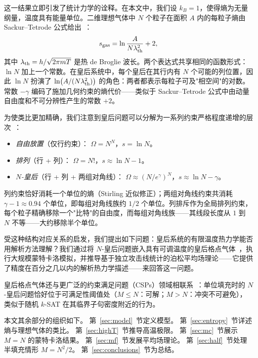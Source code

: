 \documentclass[aps, pre, reprint, amsmath, amssymb, superscriptaddress, floatfix]{revtex4-2}
\begin{document}
这一结果立即引发了统计力学的诠释。在本文中，我们设 $k_B = 1$，使得熵为无量纲量，温度具有能量单位。二维理想气体中 $N$ 个粒子在面积 $A$ 内的每粒子熵由 Sackur--Tetrode 公式给出~\cite{Reif1965}：
\begin{equation}
  s_{\rm gas} = \ln \frac{A}{N \lambda_{\rm th}^2} + 2,
  \label{eq:ST}
\end{equation}
其中 $\lambda_{\rm th} = h/\sqrt{2\pi m T}$ 是热 de Broglie 波长。两个表达式共享相同的函数形式：$\ln N$ 加上一个常数。在皇后系统中，每个皇后在其行内有 $N$ 个可能的列位置，因此
$\ln N$ 扮演了 $\ln\bigl(A/(N\lambda_{\rm th}^2)\bigr)$ 的角色：两者都表示每粒子可及"相空间"的对数。常数 $-\gamma$ 编码了施加几何约束的熵代价——类似于 Sackur--Tetrode 公式中由动量自由度和不可分辨性产生的常数 $+2$。

为使类比更加精确，我们注意到皇后问题可以分解为一系列约束严格程度递增的层次~\cite{Knuth2022}：
\begin{itemize}
  \item \textit{自由放置}（仅行约束）：
    $\Omega = N^N$，$s = \ln N$。
  \item \textit{排列}（行 + 列）：
    $\Omega = N!$，$s \approx \ln N - 1$。
  \item \textit{$N$-皇后}（行 + 列 + 两组对角线）：
    $\Omega \approx (N/e^\gamma)^N$，$s \approx \ln N - \gamma$。
\end{itemize}
列约束恰好消耗一个单位的熵（Stirling 近似修正）；两组对角线约束共消耗 $\gamma - 1 \approx 0.94$ 个单位，即每组对角线族约 $1/2$ 个单位。列排斥作为全局排列约束，每个粒子精确移除一个"比特"的自由度，而每组对角线族——其线段长度从 $1$ 到 $N$ 不等——大约移除半个单位。

受这种结构对应关系的启发，我们提出如下问题：皇后系统的有限温度热力学能否用解析方法理解？我们通过将 $N$-皇后问题嵌入具有可调温度的皇后格点气体~\cite{Zhang2009,Polson2024}，执行大规模蒙特卡洛模拟，并推导基于独立攻击线统计的泊松平均场理论——它提供了精度在百分之几以内的解析热力学描述——来回答这一问题。

皇后格点气体还与更广泛的约束满足问题（CSPs）领域相联系~\cite{Mezard2009,Krzakala2007}：单位填充时的 $N$-皇后问题恰好位于可满足性阈值处（$M \le N$：可解；$M > N$：冲突不可避免），类似于随机 $k$-SAT 在其临界子句密度附近的行为。

本文其余部分的组织如下。
第~\ref{sec:model}~节定义模型。
第~\ref{sec:entropy}~节详述熵与理想气体的类比。
第~\ref{sec:highT}~节推导高温极限。
第~\ref{sec:mc}~节展示 $M = N$ 的蒙特卡洛结果。
第~\ref{sec:mf}~节发展平均场理论。
第~\ref{sec:half}~节处理半填充情形 $M = N^2/2$。
第~\ref{sec:conclusions}~节为总结。
\end{document}
